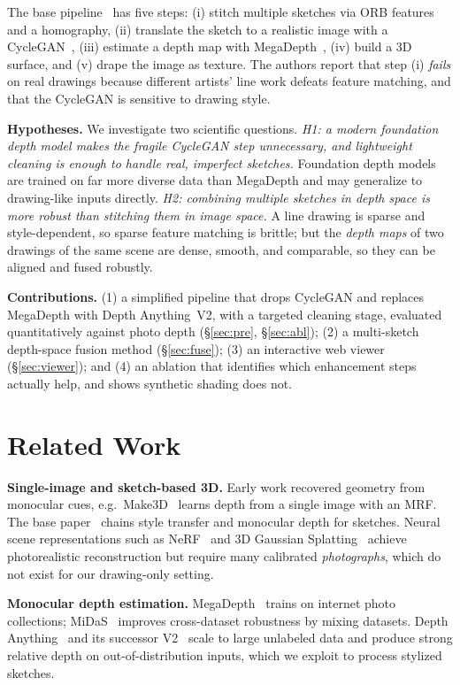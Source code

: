 \documentclass[10pt,twocolumn,letterpaper]{article}
\begin{document}
The base pipeline~\cite{talwar2018sketch} has five steps: (i) stitch
multiple sketches via ORB features and a homography, (ii) translate the
sketch to a realistic image with a CycleGAN~\cite{zhu2017cyclegan},
(iii) estimate a depth map with MegaDepth~\cite{li2018megadepth},
(iv) build a 3D surface, and (v) drape the image as texture. The authors
report that step (i) \emph{fails} on real drawings because different
artists' line work defeats feature matching, and that the CycleGAN is
sensitive to drawing style.

\textbf{Hypotheses.} We investigate two scientific questions.
\emph{H1: a modern foundation depth model makes the fragile CycleGAN step
unnecessary, and lightweight cleaning is enough to handle real, imperfect
sketches.} Foundation depth models are trained on far more diverse data than
MegaDepth and may generalize to drawing-like inputs directly. \emph{H2:
combining multiple sketches in depth space is more robust than stitching
them in image space.} A line drawing is sparse and style-dependent, so
sparse feature matching is brittle; but the \emph{depth maps} of two
drawings of the same scene are dense, smooth, and comparable, so they can be
aligned and fused robustly.

\textbf{Contributions.} (1) a simplified pipeline that drops CycleGAN and
replaces MegaDepth with Depth Anything~V2, with a targeted cleaning stage,
evaluated quantitatively against photo depth (\S\ref{sec:pre},
\S\ref{sec:abl}); (2) a multi-sketch depth-space fusion method
(\S\ref{sec:fuse}); (3) an interactive web viewer (\S\ref{sec:viewer}); and
(4) an ablation that identifies which enhancement steps actually help, and
shows synthetic shading does not.

\section{Related Work}
\textbf{Single-image and sketch-based 3D.}
Early work recovered geometry from monocular cues, e.g.\
Make3D~\cite{saxena2005make3d} learns depth from a single image with an
MRF. The base paper~\cite{talwar2018sketch} chains style transfer and
monocular depth for sketches. Neural scene representations such as
NeRF~\cite{mildenhall2020nerf} and 3D Gaussian
Splatting~\cite{kerbl20233dgs} achieve photorealistic reconstruction but
require many calibrated \emph{photographs}, which do not exist for our
drawing-only setting.

\textbf{Monocular depth estimation.}
MegaDepth~\cite{li2018megadepth} trains on internet photo collections;
MiDaS~\cite{ranftl2020midas} improves cross-dataset robustness by mixing
datasets. Depth Anything~\cite{yang2024depthv1} and its successor
V2~\cite{yang2024depthv2} scale to large unlabeled data and produce
strong relative depth on out-of-distribution inputs, which we exploit to
process stylized sketches.
\end{document}
